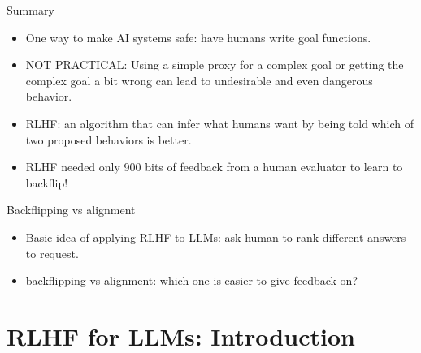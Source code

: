\begin{vbframe}{Summary}

\vfill

\textbf{}

	\begin{itemize}
		\item One way to make  AI
		systems safe: have humans 
		write goal functions.
		\item NOT PRACTICAL: Using a simple
		proxy for a complex goal or getting the
		complex goal a bit wrong can lead to
		undesirable and even dangerous behavior.
                \item
		RLHF: an algorithm that can infer
		what humans want by being told which of two
		proposed behaviors is better.
\item RLHF needed only 900 bits of feedback from a human
		evaluator to learn to backflip!
	\end{itemize}

\vfill

\end{vbframe}

\begin{vbframe}{Backflipping vs alignment}



	\begin{itemize}
        \item Basic idea of applying RLHF to LLMs: ask human
        to rank different answers to request.
		\item \ques backflipping vs alignment: which
        one is easier to give feedback on?

	\end{itemize}

\vfill

\end{vbframe}






\section{RLHF for LLMs: Introduction}





